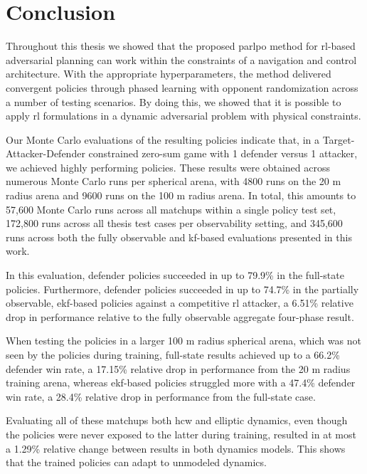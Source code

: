 \chapter{Conclusion}

Throughout this thesis we showed that the proposed \acs{parlpo} method for \acs{rl}-based adversarial planning can work within the constraints of a navigation and control architecture. With the appropriate hyperparameters, the method delivered convergent policies through phased learning with opponent randomization across a number of testing scenarios. By doing this, we showed that it is possible to apply \acs{rl} formulations in a dynamic adversarial problem with physical constraints. 

Our Monte Carlo evaluations of the resulting policies indicate that, in a Target-Attacker-Defender constrained zero-sum game with 1 defender versus 1 attacker, we achieved highly performing policies. These results were obtained across numerous Monte Carlo runs per spherical arena, with 4800 runs on the 20 m radius arena and 9600 runs on the 100 m radius arena. In total, this amounts to 57,600 Monte Carlo runs across all matchups within a single policy test set, 172,800 runs across all thesis test cases per observability setting, and 345,600 runs across both the fully observable and \acs{kf}-based evaluations presented in this work.

In this evaluation, defender policies succeeded in up to 79.9\% in the full-state policies. Furthermore, defender policies succeeded in up to 74.7\% in the partially observable, \acs{ekf}-based policies against a competitive \acs{rl} attacker, a 6.51\% relative drop in performance relative to the fully observable aggregate four-phase result.

When testing the policies in a larger 100 m radius spherical arena, which was not seen by the policies during training, full-state results achieved up to a 66.2\% defender win rate, a 17.15\% relative drop in performance from the 20 m radius training arena, whereas \acs{ekf}-based policies struggled more with a 47.4\% defender win rate, a 28.4\% relative drop in performance from the full-state case. 

Evaluating all of these matchups both \acs{hcw} and elliptic dynamics, even though the policies were never exposed to the latter during training, resulted in at most a 1.29\% relative change between results in both dynamics models. This shows that the trained policies can adapt to unmodeled dynamics.

